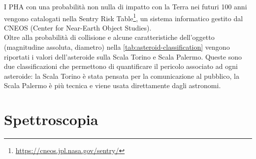\documentclass[a4paper,11pt,openright]{book}
\begin{document}
I PHA con una probabilità non nulla di impatto con la Terra nei futuri 100 anni vengono catalogati nella Sentry Risk Table\footnote{\href {https://cneos.jpl.nasa.gov/sentry/}{https://cneos.jpl.nasa.gov/sentry/} }, un sistema informatico gestito dal CNEOS (Center for Near-Earth Object Studies).\\
Oltre alla probabilità di collisione e alcune caratteristiche dell’oggetto (magnitudine assoluta, diametro) nella \cref{tab:asteroid-classification} vengono riportati i valori dell’asteroide sulla Scala Torino e Scala Palermo. Queste sono due classificazioni che permettono di quantificare il pericolo associato ad ogni asteroide: la Scala Torino è stata pensata per la comunicazione al pubblico, la Scala Palermo è più tecnica e viene usata direttamente dagli astronomi.

\chapter{Spettroscopia}
\end{document}
